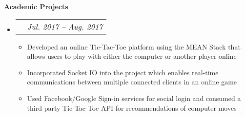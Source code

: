\documentclass[letterpaper,11pt]{article}
\makeatletter
\newcommand{\resitem}[1]{\item #1 \vspace{-2pt}}
\newcommand{\resheading}[1]{{\large \colorbox{mygrey}{\begin{minipage}{\textwidth}{\textbf{#1 \vphantom{p\^{E}}}}\end{minipage}}}}
\newcommand{\ressubheadingproj}[4]{
\begin{tabular*}{6.5in}{l@{\extracolsep{\fill}}r}
    \textbf{#1} & \textit{#2} \\
\end{tabular*}\vspace{-6pt}}
\makeatother
\begin{document}
    \resheading{Academic Projects}

    \begin{itemize}
        \item
        \ressubheadingproj
        {\href
        {https://github.com/jeremylinlin/tic-tac-toe-mean}
        {Multiplayer Tic-Tac-Toe Platform {\normalfont (Northeastern Univ.)}}
        }
        {Jul. 2017 -- Aug. 2017}
        {Web Development Intern}{Jun. 2015 -- Oct. 2015}
        { \footnotesize
        \begin{itemize}
            \resitem{Developed an online Tic-Tac-Toe platform using the MEAN Stack that allows users to play with either the computer or another player online}
            \resitem{Incorporated Socket IO into the project which enables real-time communications between multiple connected clients in an online game}
            \resitem{Used Facebook/Google Sign-in services for social login and consumed a third-party Tic-Tac-Toe API for recommendations of computer moves}
        \end{itemize}

        }
    \end{itemize}
\end{document}
